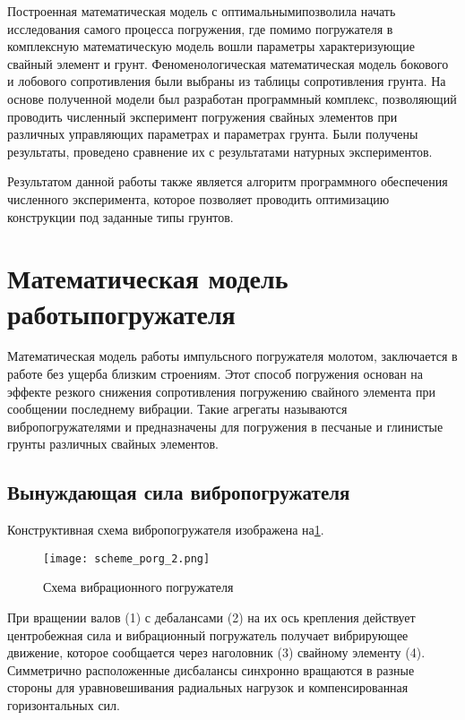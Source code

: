 Построенная математическая модель с оптимальными позволила начать исследования самого процесса погружения, где помимо погружателя в комплексную математическую модель вошли параметры характеризующие свайный элемент и грунт.
Феноменологическая математическая модель бокового и лобового сопротивления были выбраны из таблицы сопротивления грунта. На основе полученной модели был разработан программный комплекс,
позволяющий проводить численный эксперимент погружения свайных элементов при различных управляющих параметрах и параметрах грунта.
Были получены результаты, проведено сравнение их с результатами натурных экспериментов.

Результатом данной работы также является алгоритм программного обеспечения численного эксперимента, которое позволяет проводить оптимизацию конструкции под заданные типы грунтов.


\section{Математическая модель работы погружателя}

Математическая модель работы импульсного погружателя молотом, заключается в работе без ущерба близким строениям. Этот способ погружения основан на эффекте резкого снижения сопротивления погружению свайного элемента при сообщении последнему вибрации.
Такие агрегаты называются вибропогружателями и предназначены для погружения в песчаные и глинистые грунты различных свайных элементов.

\subsection{Вынуждающая сила вибропогружателя}

Конструктивная схема вибропогружателя изображена на \ref{fig:scheme_porg}.
\begin{figure}[h]
    \centering
    \texttt{[image: scheme\_porg\_2.png]}
    \caption{Схема вибрационного погружателя}
    \label{fig:scheme_porg}
\end{figure}

При вращении валов (1) с дебалансами (2) на их ось крепления действует центробежная сила и вибрационный погружатель получает вибрирующее движение,
которое сообщается через наголовник (3) свайному элементу (4). Симметрично расположенные дисбалансы синхронно вращаются в разные стороны для уравновешивания радиальных нагрузок и компенсированная горизонтальных сил.

